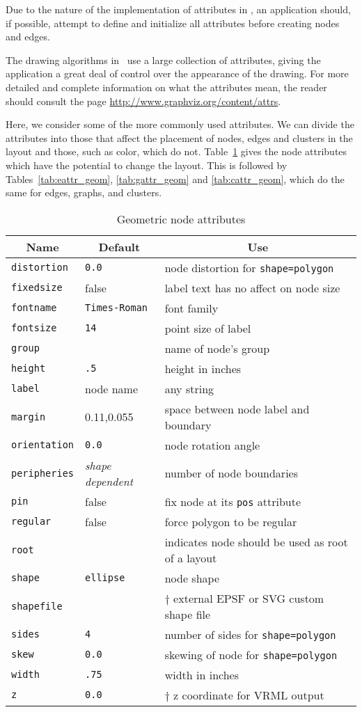 Due to the nature of the implementation of attributes in \gviz, an application 
should, if possible, attempt to define and initialize all
attributes before creating nodes and edges.

The drawing algorithms in \gviz\ use a large collection of attributes,
giving the application a great deal of control over the appearance of the
drawing. For more detailed and complete information on what the attributes mean, the
reader should consult the page \url{http://www.graphviz.org/content/attrs}.

Here, we consider some of the more commonly used attributes.
We can divide the attributes into those that affect the placement
of nodes, edges and clusters in the layout and those, such as color, 
which do not. 
Table~\ref{tab:nattr_geom} gives the node attributes which have the potential
to change the layout. This is followed by Tables~\ref{tab:eattr_geom},
\ref{tab:gattr_geom} and \ref{tab:cattr_geom}, which do the same for 
edges, graphs, and clusters.
\begin{table}[htbp]\footnotesize
\centering
\begin{tabular}[t]{|l|l|p{2.5in}|} \hline
\multicolumn{1}{|c|}{Name} & \multicolumn{1}{c|}{Default} & \multicolumn{1}{c|}{Use} \\ \hline
{\tt distortion} & {\tt 0.0} & node distortion for {\tt shape=polygon} \\
{\tt fixedsize} & false & label text has no affect on node size \\
{\tt fontname} & {\tt Times-Roman} & font family \\
{\tt fontsize} & {\tt 14} & point size of label \\
{\tt group} &  & name of node's group \\
{\tt height} & {\tt .5} & height in inches \\
{\tt label} & node name & any string \\
{\tt margin} &  0.11,0.055 & space between node label and boundary \\
{\tt orientation} & {\tt 0.0} & node rotation angle \\
{\tt peripheries} & {\em shape dependent} & number of node boundaries \\
{\tt pin} & false & fix node at its {\tt pos} attribute \\
{\tt regular} & false & force polygon to be regular \\
{\tt root} & & indicates node should be used as root of a layout \\
{\tt shape} & {\tt ellipse} & node shape \\
{\tt shapefile} & & $\dagger$ external EPSF or SVG custom shape file\\
{\tt sides} & {\tt 4} & number of sides for {\tt shape=polygon} \\
{\tt skew} & {\tt 0.0} & skewing of node for {\tt shape=polygon} \\
{\tt width} & {\tt .75} & width in inches \\
{\tt z} & {\tt 0.0} & $\dagger$ z coordinate for VRML output \\
\hline
\end{tabular}
\caption{Geometric node attributes}
\label{tab:nattr_geom}
\end{table}
